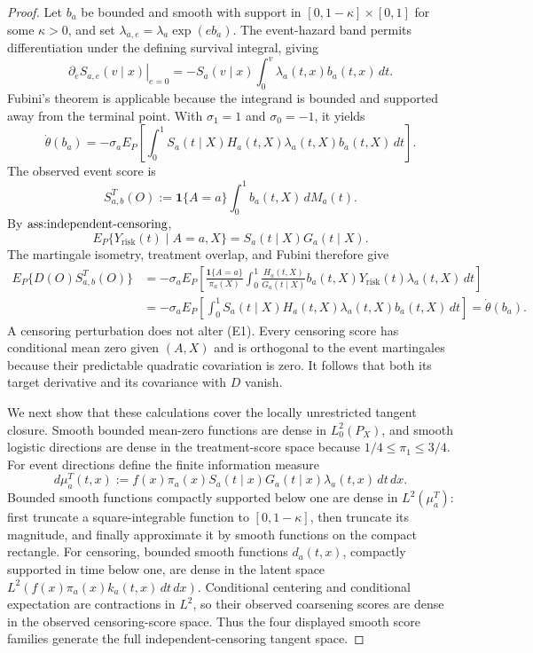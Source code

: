 \documentclass{article}
\begin{document}
\begin{proof}
Let \(b_a\) be bounded and smooth with support in \([0,1-\kappa]\times[0,1]\) for some \(\kappa>0\), and set \(\lambda_{a,e}=\lambda_a\exp(eb_a)\).  The event-hazard band permits differentiation under the defining survival integral, giving
\[
 \left.\partial_eS_{a,e}(v\mid x)\right|_{e=0}
 =-S_a(v\mid x)\int_0^v\lambda_a(t,x)b_a(t,x)\,dt.
\]
Fubini's theorem is applicable because the integrand is bounded and supported away from the terminal point.  With \(\sigma_1=1\) and \(\sigma_0=-1\), it yields
\[
 \dot\theta(b_a)
 =-\sigma_aE_P\!\left[\int_0^1S_a(t\mid X)H_a(t,X)
             \lambda_a(t,X)b_a(t,X)\,dt\right].                       \tag{E4}
\]
The observed event score is
\[
 S^T_{a,b}(O):=\mathbf 1\{A=a\}\int_0^1b_a(t,X)\,dM_a(t).
\]
By \(\textnormal{ass:independent-censoring}\),
\[
 E_P\{Y_{\mathrm{risk}}(t)\mid A=a,X\}=S_a(t\mid X)G_a(t\mid X).
\]
The martingale isometry, treatment overlap, and Fubini therefore give
\[
 \begin{split}
 E_P\{D(O)S^T_{a,b}(O)\}
 &=-\sigma_aE_P\!\left[
   \frac{\mathbf 1\{A=a\}}{\pi_a(X)}
   \int_0^1\frac{H_a(t,X)}{G_a(t\mid X)}b_a(t,X)
       Y_{\mathrm{risk}}(t)\lambda_a(t,X)\,dt\right]\\
 &=-\sigma_aE_P\!\left[\int_0^1S_a(t\mid X)H_a(t,X)
             \lambda_a(t,X)b_a(t,X)\,dt\right]
 =\dot\theta(b_a).                                                     \tag{E5}
 \end{split}
\]
A censoring perturbation does not alter (E1).  Every censoring score has conditional mean zero given \((A,X)\) and is orthogonal to the event martingales because their predictable quadratic covariation is zero.  It follows that both its target derivative and its covariance with \(D\) vanish.

We next show that these calculations cover the locally unrestricted tangent closure.  Smooth bounded mean-zero functions are dense in \(L_0^2(P_X)\), and smooth logistic directions are dense in the treatment-score space because \(1/4\le\pi_1\le3/4\).  For event directions define the finite information measure
\[
 d\mu_a^T(t,x):=f(x)\pi_a(x)S_a(t\mid x)G_a(t\mid x)
                    \lambda_a(t,x)\,dt\,dx.
\]
Bounded smooth functions compactly supported below one are dense in \(L^2(\mu_a^T)\): first truncate a square-integrable function to \([0,1-\kappa]\), then truncate its magnitude, and finally approximate it by smooth functions on the compact rectangle.  For censoring, bounded smooth functions \(d_a(t,x)\), compactly supported in time below one, are dense in the latent space \(L^2(f(x)\pi_a(x)k_a(t,x)\,dt\,dx)\).  Conditional centering and conditional expectation are contractions in \(L^2\), so their observed coarsening scores are dense in the observed censoring-score space.  Thus the four displayed smooth score families generate the full independent-censoring tangent space.


\end{proof}
\end{document}

